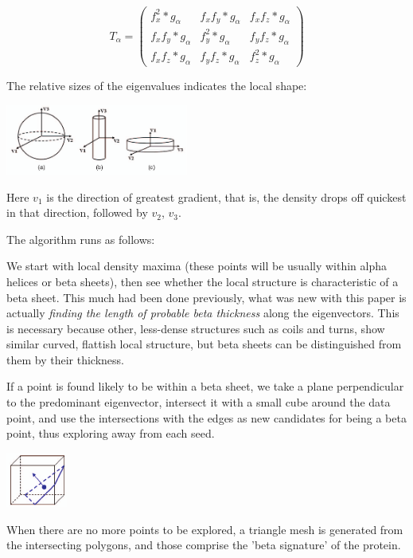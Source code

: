 \documentclass{article}
\begin{document}
\[
  T_{\alpha} =
\left( \begin{array}{ccc}
  f_{x}^2*g_{\alpha} & f_{x}f_{y}*g_{\alpha} & f_{x}f_{z}*g_{\alpha} \\
  f_{x}f_{y}*g_{\alpha} & f_{y}^2*g_{\alpha} & f_{y}f_{z}*g_{\alpha} \\
  f_{x}f_{z}*g_{\alpha} & f_{y}f_{z}*g_{\alpha} & f_{z}^2*g_{\alpha}
\end{array} \right)
\]


The relative sizes of the eigenvalues indicates the local shape:
\begin{center}
  \includegraphics[width=60mm]{shapes.png}
\end{center}

Here $v_1$ is the direction of greatest gradient, that is, the density drops off quickest
in that direction, followed by $v_2$, $v_3$.

The algorithm runs as follows:

We start with local density maxima (these points will be usually
within alpha helices or beta sheets), then see whether the local
structure is characteristic of a beta sheet. This much had been done
previously, what was new with this paper is actually \emph{finding the
length of probable beta thickness} along the eigenvectors. This is
necessary because other, less-dense structures such as coils and
turns, show similar curved, flattish local structure, but beta sheets
can be distinguished from them by their thickness.

If a point is found likely to be within a beta sheet, we take a plane
perpendicular to the predominant eigenvector, intersect it with a small
cube around the data point, and use the intersections with the edges
as new candidates for being a beta point, thus exploring away from each seed.

\begin{center}
  \includegraphics[width=20mm]{cube-plane.png}
\end{center}

When there are no more points to be explored, a triangle mesh is generated
from the intersecting polygons, and those comprise the 'beta signature'
of the protein.
\end{document}
